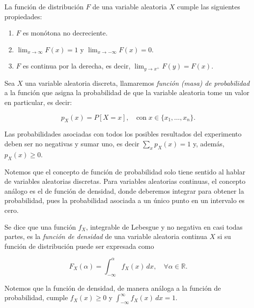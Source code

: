 \begin{proposicion}
    La función de distribución $F$ de una variable aleatoria $X$ cumple las siguientes propiedades:

    \begin{enumerate}
        \item $F$ es monótona no decreciente.
        \item $\lim_{x \to \infty} F(x) = 1$ y $\lim_{x \to -\infty} F(x) = 0$.
        \item $F$ es continua por la derecha, es decir, $\lim_{y \to x^+} F(y) = F(x)$.
    \end{enumerate}
\end{proposicion}

\begin{definicion}\label{def:funcion-de-probabilidad}
    Sea $X$ una variable aleatoria discreta, llamaremos \emph{función (masa) de probabilidad} a la función que asigna la probabilidad de que la variable aleatoria tome un valor en particular, es decir:

    \[ p_X(x) = P[X = x], \quad \text{con} \; x \in \{x_1, \ldots, x_n\}. \]
\end{definicion}

Las probabilidades asociadas con todos los posibles resultados del experimento deben ser no negativas y sumar uno, es decir $ \sum_x p_X(x) = 1 $ y, además, $p_X(x) \ge 0$.

Notemos que el concepto de función de probabilidad solo tiene sentido al hablar de variables aleatorias discretas. Para variables aleatorias continuas, el concepto análogo es el de función de densidad, donde deberemos integrar para obtener la probabilidad, pues la probabilidad asociada a un único punto en un intervalo es cero.

\begin{definicion}\label{def:funcion-de-densidad}
    Se dice que una función $f_X$, integrable de Lebesgue y no negativa en casi todas partes, es la \emph{función de densidad} de una variable aleatoria continua $X$ si su función de distribución puede ser expresada como

    \[ F_X(\alpha) =  \int_{-\infty}^{\alpha} f_X(x) \, dx, \quad \forall \alpha \in \mathbb{R}. \]
\end{definicion}

Notemos que la función de densidad, de manera análoga a la función de probabilidad, cumple $ f_X(x) \ge 0$ y $ \int_{-\infty}^{\infty} f_X(x) \, dx = 1$.


